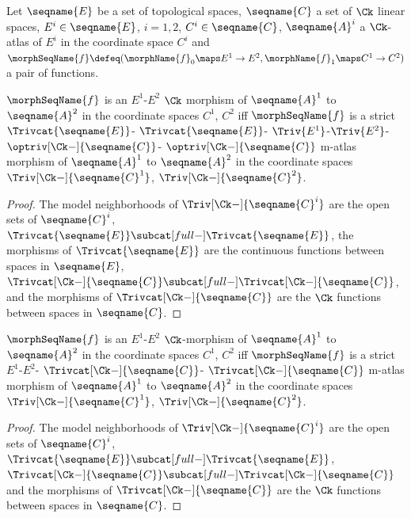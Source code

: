 \documentclass{article}
\begin{document}
\begin{lemma}
\label{lem:Ck-ATLmorph}
Let $\seqname{E}$ be a set of topological spaces, $\seqname{C}$ a set of
$\Ck$ linear spaces, $E^i \in \seqname{E}$, $i=1,2$,
$C^i \in \seqname{C}$, $\seqname{A}^i$ a $\Ck$-atlas of $E^i$ in the
coordinate space $C^i$ and
$
  \morphSeqName{f} \defeq
  (
    \morphName{f}_0 \maps E^1 \to E^2,
    \morphName{f}_1 \maps C^1 \to C^2
  )
$
a pair of functions.

$\morphSeqName{f}$ is an $E^1$-$E^2$ $\Ck$ morphism of
$\seqname{A}^1$ to $\seqname{A}^2$ in the coordinate spaces $C^1$, $C^2$
iff $\morphSeqName{f}$ is a strict
$\Trivcat{\seqname{E}}$-%
$\Trivcat{\seqname{E}}$-%
$\Triv{E^1}$-$\Triv{E^2}$-%
$\optriv[\Ck-]{\seqname{C}}$-%
$\optriv[\Ck-]{\seqname{C}}$
m-atlas morphism of $\seqname{A}^1$ to $\seqname{A}^2$ in the
coordinate spaces $\Triv[\Ck-]{\seqname{C}^1}$,
$\Triv[\Ck-]{\seqname{C}^2}$.

\begin{proof}
The model neighborhoods of $\Triv[\Ck-]{\seqname{C}^i}$ are the open sets
of $\seqname{C}^i$,
$\Trivcat{\seqname{E}} \subcat[full-] \Trivcat{\seqname{E}}$,
the morphisms of $\Trivcat{\seqname{E}}$ are the continuous
functions between spaces in $\seqname{E}$,
$\Trivcat[\Ck-]{\seqname{C}} \subcat[full-] \Trivcat[\Ck-]{\seqname{C}}$,
and the morphisms of $\Trivcat[\Ck-]{\seqname{C}}$ are the $\Ck$
functions between spaces in $\seqname{C}$.
\end{proof}

$\morphSeqName{f}$ is an $E^1$-$E^2$ $\Ck$-morphism of $\seqname{A}^1$ to
$\seqname{A}^2$ in the coordinate spaces $C^1$, $C^2$ iff
$\morphSeqName{f}$ is a strict
$E^1$-$E^2$-%
$\Trivcat[\Ck-]{\seqname{C}}$-%
$\Trivcat[\Ck-]{\seqname{C}}$
m-atlas morphism of $\seqname{A}^1$ to $\seqname{A}^2$ in the coordinate
spaces $\Triv[\Ck-]{\seqname{C}^1}$, $\Triv[\Ck-]{\seqname{C}^2}$.

\begin{proof}
The model neighborhoods of $\Triv[\Ck-]{\seqname{C}^i}$ are the open sets
of $\seqname{C}^i$,
$\Trivcat{\seqname{E}} \subcat[full-] \Trivcat{\seqname{E}}$,
$\Trivcat[\Ck-]{\seqname{C}} \subcat[full-] \Trivcat[\Ck-]{\seqname{C}}$
and the morphisms of $\Trivcat[\Ck-]{\seqname{C}}$ are the $\Ck$
functions between spaces in $\seqname{C}$.
\end{proof}
\end{lemma}
\end{document}
